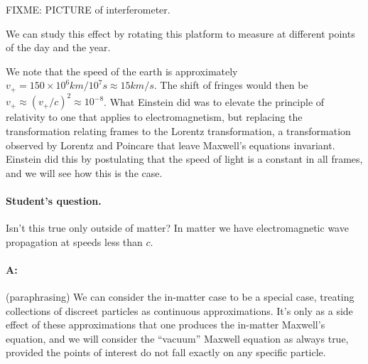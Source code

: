 FIXME: PICTURE of interferometer.

We can study this effect by rotating this platform to measure at different points of the day and the year.

We note that the speed of the earth is approximately $v_{+} = 150 \times 10^6 km/ 10^7 s \approx 15 km/s$.  The shift of fringes would then be $v_{+} \approx (v_{+}/c)^2 \approx 10^{-8}$.  What Einstein did was to elevate the principle of relativity to one that applies to electromagnetism, but replacing the transformation relating frames to the Lorentz transformation, a transformation observed by Lorentz and Poincare that leave Maxwell's equations invariant.  Einstein did this by postulating that the speed of light is a constant in all frames, and we will see how this is the case.

\paragraph{Student's question.}  Isn't this true only outside of matter?  In matter we have electromagnetic wave propagation at speeds less than $c$.

\paragraph{A:}  (paraphrasing) We can consider the in-matter case to be a special case, treating collections of discreet particles as continuous approximations.  It's only as a side effect of these approximations that one produces the in-matter Maxwell's equation, and we will consider the ``vacuum'' Maxwell equation as always true, provided the points of interest do not fall exactly on any specific particle.

\EndNoBibArticle
